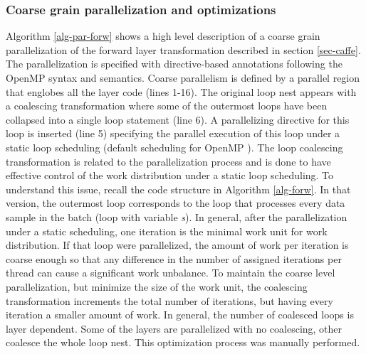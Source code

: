 \subsubsection{Coarse grain parallelization and optimizations}
Algorithm \ref{alg-par-forw} shows a high level description of a 
coarse grain parallelization of the forward layer transformation 
described in section \ref{sec-caffe}. The parallelization is specified 
with directive-based annotations following the OpenMP syntax and semantics. 
Coarse parallelism is defined by a parallel region that englobes all the 
layer code (lines 1-16). The original loop nest appears with a coalescing 
transformation where some of the outermost loops have been collapsed into a 
single loop statement (line 6). A parallelizing directive for this loop 
is inserted (line 5) specifying the parallel execution of this loop 
under a static loop scheduling (default scheduling for OpenMP \cite{basumallik2007programming}). 
The loop coalescing transformation is related to the parallelization 
process and is done to have effective control of the work distribution 
under a static loop scheduling. To understand this issue, recall the 
code structure in Algorithm \ref{alg-forw}. In that version, the outermost 
loop corresponds to the loop that processes every data sample in the 
batch (loop with variable \emph{s}). In general, after the 
parallelization under a static scheduling, one iteration is the minimal 
work unit for work distribution. If that loop were parallelized, the 
amount of work per iteration is coarse enough so that any difference 
in the number of assigned iterations per thread can cause a significant  
work unbalance. To maintain the coarse level parallelization, but minimize 
the size of the work unit, the coalescing transformation increments the 
total number of iterations, but having every iteration a smaller 
amount of work. In general, the number of coalesced loops is layer 
dependent. Some of the layers are parallelized with no coalescing, 
other coalesce the whole loop nest. This optimization process was 
manually performed.

